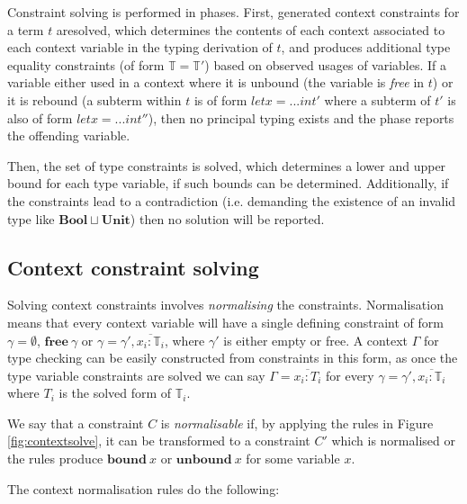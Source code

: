 \documentclass[preprint]{sigplanconf}
\newcommand{\figref}[1]{Figure \ref{#1}}
\newcommand{\unitt}{\mathbf{Unit}}
\newcommand{\boolt}{\mathbf{Bool}}
\newcommand{\free}[1]{\mathbf{free}\:#1}
\newcommand{\tinf}{\mathbb{T}}
\begin{document}
Constraint solving is performed in phases. First, generated context constraints
for a term $t$ aresolved, which determines the contents of each context associated to
each context variable in the typing derivation of $t$, and produces additional
type equality constraints (of form $\mathbb{T} = \mathbb{T}'$) based on
observed usages of variables. If a variable either used in a context where
it is unbound (the variable is {\it free} in $t$) or it is rebound
(a subterm within $t$ is of form $let x = ... in t'$ where a subterm of $t'$
is also of form $let x = ... in t''$), then no principal typing exists and
the phase reports the offending variable.

Then, the set of type constraints is solved, which determines a lower and
upper bound for each type variable, if such bounds can be determined.
Additionally, if the constraints lead to a contradiction (i.e. demanding the
existence of an invalid type like $\boolt \sqcup \unitt$) then no solution
will be reported.

\subsection{Context constraint solving}

Solving context constraints involves {\it normalising} the constraints. 
Normalisation means that every context variable will have a single 
defining constraint of form $\gamma = \emptyset$, $\free{\gamma}$ or
$\gamma = \gamma', \overline{x_i : \tinf_i}$, where $\gamma'$ is
either empty or free. A context $\Gamma$ for type checking can be easily
constructed from constraints in this form, as once the type variable
constraints are solved we can say $\Gamma = \overline{x_i : T_i}$ for
every $\gamma = \gamma', \overline{x_i : \tinf_i}$ where $T_i$ is the
solved form of $\tinf_i$.

We say that a constraint $C$ is {\it normalisable} if, by
applying the rules in \figref{fig:contextsolve}, it can be transformed to
a constraint $C'$ which is normalised or the rules produce $\mathbf{bound}\:x$
or $\mathbf{unbound}\:x$ for some variable $x$.

The context normalisation rules do the following:
\end{document}
